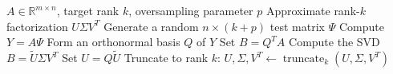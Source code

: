 \begin{algorithm}[!htbp]
\caption{rSVD}
\label{alg:rsvd}
\begin{algorithmic}[1]
    \Require $A\in\mathbb R^{m\times n}$, target rank $k$, oversampling parameter $p$
    \Ensure Approximate rank-$k$ factorization $U\Sigma V^T$
    \State Generate a random $n\times(k+p)$ test matrix $\Psi$
    \State Compute $Y = A\Psi$
    \State Form an orthonormal basis $Q$ of $Y$
    \State Set $B = Q^TA$
    \State Compute the SVD $B = \tilde U\Sigma V^T$
    \State Set $U = Q\tilde U$
    \State Truncate to rank $k$: $U, \Sigma, V^T \leftarrow \operatorname{truncate}_k(U, \Sigma, V^T)$
\end{algorithmic}
\end{algorithm}